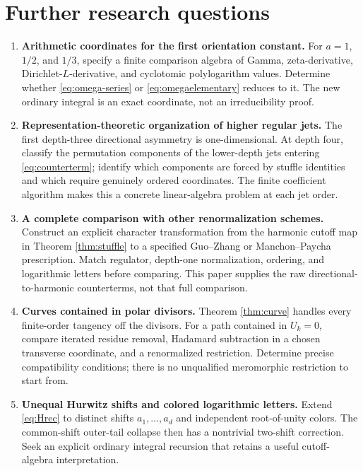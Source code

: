 \documentclass[11pt,a4paper]{article}
\numberwithin{equation}{section}
\theoremstyle{definition}\newtheorem{definition}[theorem]{Definition}
\theoremstyle{remark}\newtheorem{remark}[theorem]{Remark}
\begin{document}
\section{Further research questions}
\label{sec:future}

\begin{enumerate}[label=\textbf{Q\arabic*.},itemsep=9pt]
\item \textbf{Arithmetic coordinates for the first orientation constant.}
For $a=1$, $1/2$, and $1/3$, specify a finite comparison algebra of
Gamma, zeta-derivative, Dirichlet-$L$-derivative, and cyclotomic
polylogarithm values. Determine whether \eqref{eq:omega-series} or
\eqref{eq:omegaelementary} reduces to it. The new ordinary integral is
an exact coordinate, not an irreducibility proof.

\item \textbf{Representation-theoretic organization of higher regular
jets.} The first depth-three directional asymmetry is one-dimensional.
At depth four, classify the permutation components of the lower-depth
jets entering \eqref{eq:counterterm}; identify which components are
forced by stuffle identities and which require genuinely ordered
coordinates. The finite coefficient algorithm makes this a concrete
linear-algebra problem at each jet order.

\item \textbf{A complete comparison with other renormalization schemes.}
Construct an explicit character transformation from the harmonic cutoff
map in Theorem \ref{thm:stuffle} to a specified Guo--Zhang or
Manchon--Paycha prescription. Match regulator, depth-one normalization,
ordering, and logarithmic letters before comparing. This paper supplies
the raw directional-to-harmonic counterterms, not that full comparison.

\item \textbf{Curves contained in polar divisors.} Theorem
\ref{thm:curve} handles every finite-order tangency off the divisors.
For a path contained in $U_k=0$, compare iterated residue removal,
Hadamard subtraction in a chosen transverse coordinate, and a
renormalized restriction. Determine precise compatibility conditions;
there is no unqualified meromorphic restriction to start from.

\item \textbf{Unequal Hurwitz shifts and colored logarithmic letters.}
Extend \eqref{eq:Hrec} to distinct shifts $a_1,\ldots,a_d$ and
independent root-of-unity colors. The common-shift outer-tail collapse
then has a nontrivial two-shift correction. Seek an explicit ordinary
integral recursion that retains a useful cutoff-algebra interpretation.


\end{enumerate}
\end{document}
